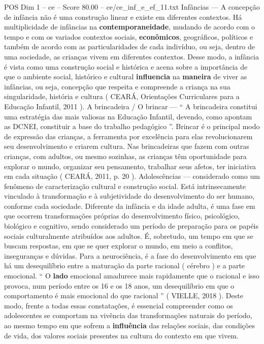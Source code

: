 \begin{textsample}{POS Dim 1 – ce – Score 80.00 – ce/ce\_inf\_e\_ef\_11.txt}
Infâncias — A concepção de infância não é uma construção linear e existe em diferentes contextos.
Há multiplicidade de infâncias na \textbf{contemporaneidade}, mudando de acordo com o tempo e com os variados contextos sociais, \textbf{econômicos}, geográficos, políticos e também de acordo com as particularidades de cada indivíduo, ou seja, dentro de uma sociedade, as crianças vivem em diferentes contextos.
Desse modo, a infância é vista como uma construção social e histórica e acena sobre a importância de que o ambiente social, histórico e cultural \textbf{influencia} na \textbf{maneira} de viver as infâncias, ou seja, concepção que respeita e compreende a criança na sua singularidade, história e cultura ( CEARÁ, Orientações Curriculares para a Educação Infantil, 2011 ).
A brincadeira / O brincar — “ A brincadeira constitui uma estratégia das mais valiosas na Educação Infantil, devendo, como apontam as DCNEI, constituir a base do trabalho pedagógico ”.
Brincar é o principal modo de expressão das crianças, a ferramenta por excelência para elas revolucionarem seu desenvolvimento e criarem cultura.
Nas brincadeiras que fazem com outras crianças, com adultos, ou mesmo sozinhas, as crianças têm oportunidade para explorar o mundo, organizar seu pensamento, trabalhar seus afetos, ter iniciativa em cada situação ( CEARÁ, 2011, p. 20 ).
Adolescências — considerado como um fenômeno de caracterização cultural e construção social.
Está intrinsecamente vinculado à transformação e à subjetividade do desenvolvimento do ser humano, conforme cada sociedade.
Diferente da infância e da idade adulta, é uma fase em que ocorrem transformações próprias do desenvolvimento físico, psicológico, biológico e cognitivo, sendo considerado um período de preparação para os papéis sociais culturalmente atribuídos aos adultos.
É, sobretudo, um tempo em que se buscam respostas, em que se quer explorar o mundo, em meio a conflitos, inseguranças e dúvidas.
Para a neurociência, é a fase do desenvolvimento em que há um desequilíbrio entre a maturação da parte racional ( cérebro ) e a parte emocional. “ O \textbf{lado} emocional amadurece mais rapidamente que o racional e isso provoca, num período entre os 16 e os 18 anos, um desequilíbrio em que o comportamento é mais emocional do que racional ” ( VIELLE, 2018 ).
Deste modo, frente a todas essas constatações, é essencial compreender como os adolescentes se comportam na vivência das transformações naturais do período, ao mesmo tempo em que sofrem a \textbf{influência} das relações sociais, das condições de vida, dos valores sociais presentes na cultura do contexto em que vivem.

\end{textsample}
